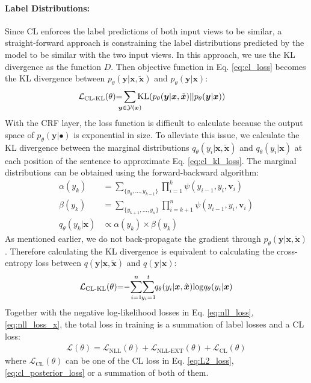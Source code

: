 \documentclass[11pt,a4paper]{article}
\def\vv{{\bm{v}}}
\def\vx{{\bm{x}}}
\def\vy{{\bm{y}}}
\newcommand{\mcL}{\mathcal{L}}
\newcommand{\mcY}{\mathcal{Y}}
\begin{document}
\paragraph{Label Distributions:} Since CL enforces the label predictions of both input views to be similar, a straight-forward approach is constraining the label distributions predicted by the model to be similar with the two input views. In this approach, we use the KL divergence as the function $D$. Then objective function in Eq. \ref{eq:cl_loss} becomes the KL divergence between $p_\theta(\vy|\vx, \tilde{\vx})$ and $p_\theta(\vy|\vx)$:
\begin{align}
\mcL_{\text{CL-KL}}(\theta)&{=}\sum_{\mathclap{\vy \in \mcY(\vx)}} \text{KL}(p_\theta(\vy|\vx, \tilde{\vx})||p_\theta(\vy|\vx)) \label{eq:cl_kl_loss}
\end{align}
With the CRF layer, the loss function is difficult to calculate because the output space of $p_\theta(\vy|\bullet)$ is exponential in size. To alleviate this issue, we calculate the KL divergence between the marginal distributions $q_\theta(y_i|\vx,\tilde{\vx})$ and $q_\theta(y_i|\vx)$ at each position of the sentence to approximate Eq. \ref{eq:cl_kl_loss}. The marginal distributions can be obtained using the forward-backward algorithm:
\begin{align}
\alpha(y_k)&=\sum\limits_{\{y_0,\dots,y_{k-1}\}} \prod\limits_{i=1}^{k} \psi(y_{i-1}, y_i, \vv_i)\nonumber\\
\beta(y_k) &= \sum\limits_{\{y_{k+1},\dots,y_n\}} \prod\limits_{i=k+1}^{n} \psi(y_{i-1}, y_i, \vv_i)\nonumber\\
q_\theta(y_k|\vx)
&\propto \alpha(y_k) \times \beta(y_k) \label{eq:posterior}  \end{align}
As mentioned earlier, we do not back-propagate the gradient through $p_\theta(\vy|\vx, \tilde{\vx})$. Therefore calculating the KL divergence is equivalent to calculating the cross-entropy loss between $q(\vy|\vx, \tilde{\vx})$ and $q(\vy|\vx)$:
\begin{align}
\mcL_{\text{CL-KL}}{(}\theta{)}{=}{-}{\sum_{\mathclap{i=1}}^{n}}{\sum_{\mathclap{y_i=1}}^{t}} q_\theta(y_i|\vx,\tilde{\vx}){\log} q_\theta(y_i|\vx) \label{eq:cl_posterior_loss}
\end{align}
Together with the negative log-likelihood losses in Eq. \ref{eq:nll_loss}, \ref{eq:nll_loss_x}, the total loss in training is a summation of label losses and a CL loss:
\begin{align}
\mcL(\theta) = \mcL_{\text{NLL}}(\theta) + \mcL_{\text{NLL-EXT}}(\theta) + \mcL_{\text{CL}}(\theta) \label{eq:final_loss}
\end{align}
where $\mcL_{\text{CL}}(\theta)$ can be one of the CL loss in Eq. \ref{eq:L2_loss}, \ref{eq:cl_posterior_loss} or a summation of both of them.
\end{document}

